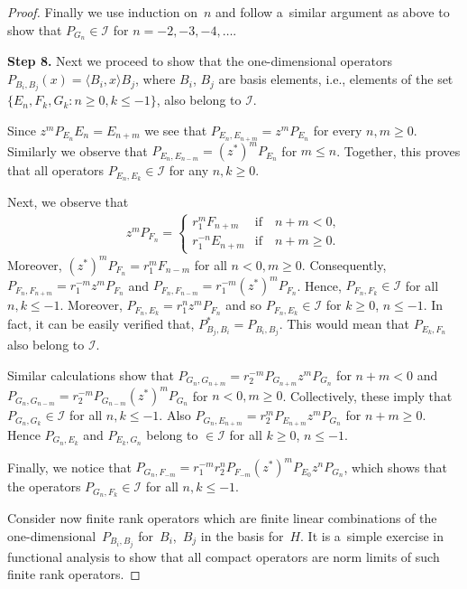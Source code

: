 \begin{proof}
Finally we use induction on~$n$ and follow a~similar argument as above to show that $P_{G_n} \in \mathcal I$ for
$n=-2,-3, -4, \dots$.

{\bf Step 8.} Next we proceed to show that the one-dimensional operators $P_{B_i, B_j}(x)= \langle B_i, x \rangle B_j$,
where $B_i$, $B_j$ are basis elements, i.e., elements of the set $\{E_n, F_k, G_k: n \geq 0, k \leq -1\}$, also belong to
$\mathcal I$.

Since $z^m P_{E_n}E_n= E_{n+m}$ we see that $P_{E_n, E_{n+m}}=z^m P_{E_n}$ for every $n,m \geq 0$.
Similarly we observe that $P_{E_n, E_{n-m}}=(z^*)^mP_{E_n}$ for $m \leq n$.
Together, this proves that all operators $P_{E_n, E_k} \in \mathcal I$ for any $n,k \geq 0$.

Next, we observe that
\begin{gather*}
z^m P_{F_n}=
\begin{cases}
r_1^m F_{n+m} & \text{if}\quad  n+m <0,
\\
r_1^{-n}E_{n+m} & \text{if}\quad  n+m \geq 0.
\end{cases}
\end{gather*}
Moreover, $(z^*)^m P_{F_n}=r_1^m F_{n-m}$ for all $n<0, m\geq 0$.
Consequently, $P_{F_n,F_{n+m}}=r_1^{-m}z^m P_{F_n}$ and $P_{F_n,F_{n-m}}=r_1^{-m} (z^*)^m P_{F_n}$.
Hence, $P_{F_n, F_k} \in \mathcal I$ for all $n,k \leq -1$.
Moreover, $P_{F_n,E_k}=r_1^nz^mP_{F_n}$ and so $P_{F_n,E_k}\in\mathcal I$ for $k\geq 0$, $n\leq -1$.
In fact, it can be easily verif\/ied that, $P_{B_j, B_i}^*=P_{B_i, B_j}$.
This would mean that $P_{E_k,F_n}$ also belong to $\mathcal I$.

Similar calculations show that $P_{G_n, G_{n+m}}= r_2^{-m}P_{G_{n+m}}z^m P_{G_n}$ for $n+m<0$ and $P_{G_n, G_{n-m}}=
r_2^{-m}P_{G_{n-m}}(z^*)^m P_{G_n}$ for $n<0, m\geq 0$.
Collectively, these imply that $P_{G_n, G_k} \in \mathcal I$ for all \mbox{$n,k \leq -1$}.
Also $P_{G_n, E_{n+m}}= r_2^{m}P_{E_{n+m}}z^m P_{G_n}$ for $n+m \geq 0$.
Hence $P_{G_n, E_k}$ and $P_{E_k,G_n}$ belong to $\in \mathcal I$ for all $k \geq 0$, $n \leq -1$.

Finally, we notice that $P_{G_n, F_{-m}}= r_1^{-m}r_2^n P_{F_{-m}}(z^*)^m P_{E_0}z^n P_{G_n}$, which shows that the
operators $P_{G_n, F_k} \in \mathcal I$ for all $n,k \leq -1$.

Consider now f\/inite rank operators which are f\/inite linear combinations of the one-dimensio\-nal~$P_{B_i, B_j}$ for~$B_i$,~$B_j$ in the basis for~$H$.
It is a~simple exercise in functional analysis to show that all compact operators are norm limits of such f\/inite rank
operators.
\end{proof}

